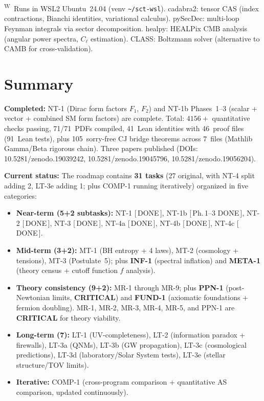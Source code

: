 \documentclass[12pt,a4paper]{article}
\begin{document}
\noindent\textsuperscript{W}~Runs in WSL2 Ubuntu~24.04 (venv \texttt{\textasciitilde/sct-wsl}).
cadabra2: tensor CAS (index contractions, Bianchi identities, variational calculus).
pySecDec: multi-loop Feynman integrals via sector decomposition.
healpy: HEALPix CMB analysis (angular power spectra, $C_\ell$ estimation).
CLASS: Boltzmann solver (alternative to CAMB for cross-validation).

\section*{Summary}

\textbf{Completed:} NT-1 (Dirac form factors $F_1$, $F_2$) and
NT-1b Phases~1--3 (scalar + vector + combined SM form factors) are complete.
Total: $4156{+}$ quantitative checks passing, 71/71~PDFs compiled,
41~Lean identities with 46~proof files (91~Lean tests),
plus 105~sorry-free CJ bridge theorems across 7~files (Mathlib Gamma/Beta rigorous chain).
Three papers published (DOIs: 10.5281/zenodo.19039242,
10.5281/zenodo.19045796, 10.5281/zenodo.19056204).

\textbf{Current status:} The roadmap contains \textbf{31 tasks}
(27 original, with NT-4 split adding 2, LT-3e adding 1; plus COMP-1 running iteratively)
organized in five categories:
\begin{itemize}
  \item \textbf{Near-term (5+2 subtasks):} NT-1 \textcolor{proven}{[\,DONE\,]},
    NT-1b \textcolor{proven}{[\,Ph.\,1--3 DONE\,]},
    NT-2 \textcolor{proven}{[\,DONE\,]}, NT-3 \textcolor{proven}{[\,DONE\,]},
    NT-4a \textcolor{proven}{[\,DONE\,]}, NT-4b \textcolor{proven}{[\,DONE\,]},
    NT-4c \textcolor{proven}{[\,DONE\,]}.
  \item \textbf{Mid-term (3+2):} MT-1 (BH entropy + 4 laws), MT-2 (cosmology + tensions),
    MT-3 (Postulate~5); plus \textbf{INF-1} (spectral inflation) and
    \textbf{META-1} (theory census + cutoff function $f$ analysis).
  \item \textbf{Theory consistency (9+2):} MR-1 through MR-9; plus
    \textbf{PPN-1} (post-Newtonian limits, \textbf{CRITICAL}) and
    \textbf{FUND-1} (axiomatic foundations + fermion doubling).
    MR-1, MR-2, MR-3, MR-4, MR-5, and PPN-1 are \textbf{CRITICAL} for theory viability.
  \item \textbf{Long-term (7):} LT-1 (UV-completeness), LT-2 (information
    paradox + firewalls), LT-3a (QNMs), LT-3b (GW propagation),
    LT-3c (cosmological predictions), LT-3d (laboratory/Solar System tests),
    LT-3e (stellar structure/TOV limits).
  \item \textbf{Iterative:} COMP-1 (cross-program comparison + quantitative AS
    comparison, updated continuously).
\end{itemize}
\end{document}
